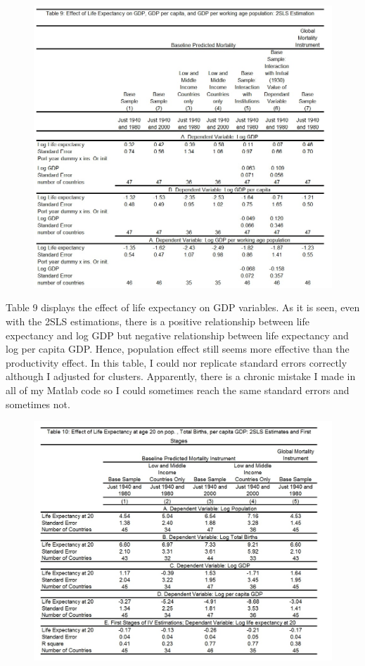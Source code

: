\documentclass[11pt]{article}
\begin{document}
\begin{figure}
\centering
\includegraphics[width=\textwidth]{table9}
\label{table9}
\end{figure}
Table 9 displays the effect of life expectancy on GDP variables. As it is seen, even with the 2SLS estimations, there is a positive relationship between life expectancy and log GDP but negative relationship between life expectancy and log per capita GDP. Hence, population effect still seems more effective than the productivity effect. In this table, I could nor replicate standard errors correctly although I adjusted for clusters. Apparently, there is a chronic mistake I made in all of my Matlab code so I could sometimes reach the same standard errors and sometimes not.
\begin{figure} [H]
\centering
\includegraphics[width=\textwidth]{table10}
\label{table10}
\end{figure}
\end{document}
